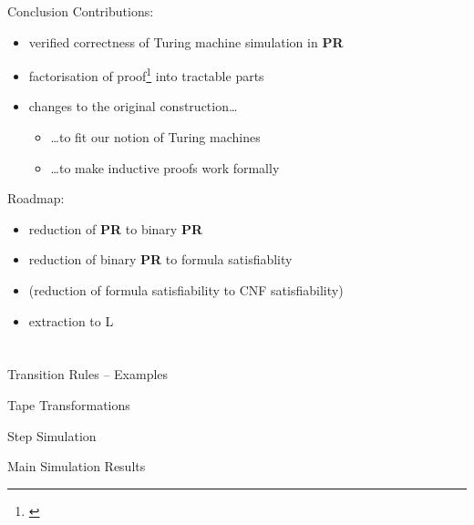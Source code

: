 \documentclass[11pt,usenames,dvipsnames,
hyperref={pdfencoding=auto,psdextra}]{beamer}
\makeatletter
\def\beamer@writeslidentry@miniframesoff{%
  \expandafter\beamer@ifempty\expandafter{\beamer@framestartpage}{}%
  {%
    \clearpage\beamer@notesactions%
  }
}
\newcommand*{\miniframesoff}{\let\beamer@writeslidentry=\beamer@writeslidentry@miniframesoff}
\newcommand*{\PR}{\textbf{PR}}
\makeatother
\begin{document}
\begin{frame}{Conclusion}
  Contributions: 
  \begin{itemize}
    \item verified correctness of Turing machine simulation in \PR{}
    \item factorisation of proof\footnote{\cite{Sipser:TheoryofComputation}} into tractable parts
    \item changes to the original construction\ldots
      \begin{itemize}
        \item \ldots to fit our notion of Turing machines
        \item \ldots to make inductive proofs work formally
      \end{itemize}
  \end{itemize}

  \vspace{3ex}

  Roadmap:
  \begin{itemize}
    \item reduction of \PR{} to binary \PR{}
    \item reduction of binary \PR{} to formula satisfiablity
    \item (reduction of formula satisfiability to CNF satisfiability)
    \item extraction to L
  \end{itemize}
\end{frame}

\miniframesoff
\section{}

\begin{frame}{Transition Rules -- Examples}

\end{frame}

\begin{frame}{Tape Transformations}

\end{frame}

\begin{frame}{Step Simulation}
\end{frame}

\begin{frame}{Main Simulation Results}

\end{frame}
\end{document}

